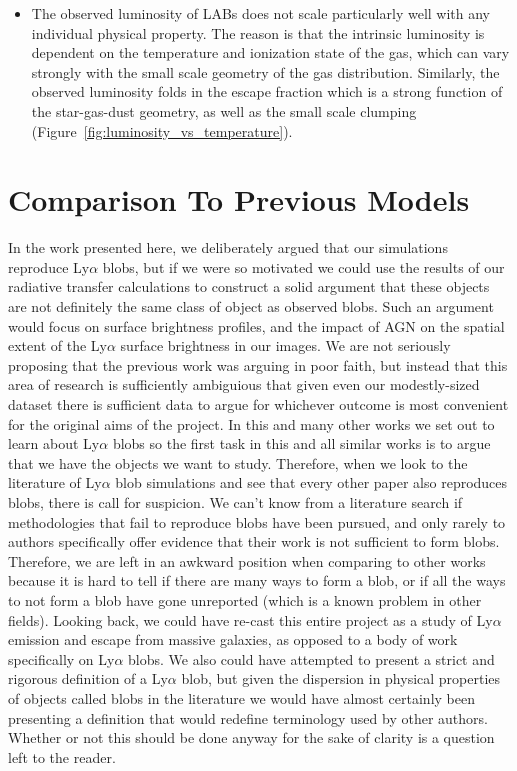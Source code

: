 \begin{itemize}
    \item The observed luminosity of LABs does not scale particularly well with any individual physical property.  The reason is that the intrinsic luminosity is dependent on the temperature and ionization state of the gas, which can vary strongly with the small scale geometry of the gas distribution.  Similarly, the observed luminosity folds in the escape fraction which is a strong function of the star-gas-dust geometry, as well as the small scale clumping  (Figure~\ref{fig:luminosity_vs_temperature}).
    
\end{itemize}


\section{Comparison To Previous Models}
In the work presented here, we deliberately argued that our simulations reproduce Ly$\alpha$ blobs, but if we were so motivated we could use the results of our radiative transfer calculations to construct a solid argument that these objects are not definitely the same class of object as observed blobs.
Such an argument would focus on surface brightness profiles, and the impact of AGN on the spatial extent of the Ly$\alpha$ surface brightness in our images.
We are not seriously proposing that the previous work was arguing in poor faith, but instead that this area of research is sufficiently ambiguious that given even our modestly-sized dataset there is sufficient data to argue for whichever outcome is most convenient for the original aims of the project.
In this and many other works we set out to learn about Ly$\alpha$ blobs so the first task in this and all similar works is to argue that we have the objects we want to study.
Therefore, when we look to the literature of Ly$\alpha$ blob simulations and see that every other paper also reproduces blobs, there is call for suspicion.
We can't know from a literature search if methodologies that fail to reproduce blobs have been pursued, and only rarely to authors specifically offer evidence that their work is not sufficient to form blobs.
Therefore, we are left in an awkward position when comparing to other works because it is hard to tell if there are many ways to form a blob, or if all the ways to not form a blob have gone unreported (which is a known problem in other fields).
Looking back, we could have re-cast this entire project as a study of Ly$\alpha$ emission and escape from massive galaxies, as opposed to a body of work specifically on Ly$\alpha$ blobs.
We also could have attempted to present a strict and rigorous definition of a Ly$\alpha$ blob, but given the dispersion in physical properties of objects called blobs in the literature we would have almost certainly been presenting a definition that would redefine terminology used by other authors.
Whether or not this should be done anyway for the sake of clarity is a question left to the reader.

